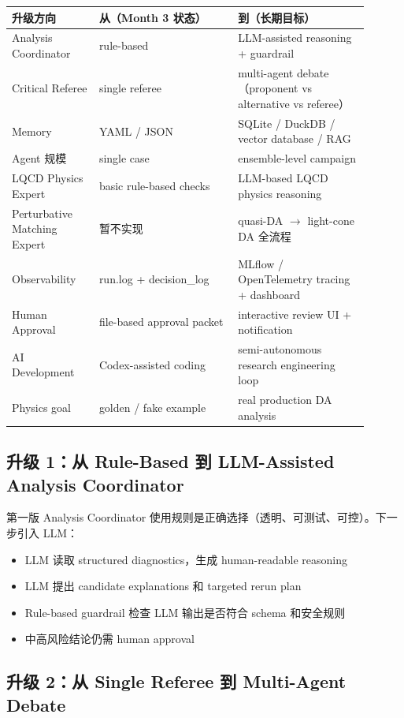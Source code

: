 \documentclass[11pt,a4paper,fontset=fandol]{ctexart}
\begin{document}
\begin{center}
\begin{tabular}{p{0.22\linewidth}p{0.35\linewidth}p{0.33\linewidth}}
\toprule
升级方向 & 从（Month 3 状态） & 到（长期目标） \\
\midrule
Analysis Coordinator & rule-based & LLM-assisted reasoning + guardrail \\
Critical Referee & single referee & multi-agent debate（proponent vs alternative vs referee） \\
Memory & YAML / JSON & SQLite / DuckDB / vector database / RAG \\
Agent 规模 & single case & ensemble-level campaign \\
LQCD Physics Expert & basic rule-based checks & LLM-based LQCD physics reasoning \\
Perturbative Matching Expert & 暂不实现 & quasi-DA $\to$ light-cone DA 全流程 \\
Observability & run.log + decision\_log & MLflow / OpenTelemetry tracing + dashboard \\
Human Approval & file-based approval packet & interactive review UI + notification \\
AI Development & Codex-assisted coding & semi-autonomous research engineering loop \\
Physics goal & golden / fake example & real production DA analysis \\
\bottomrule
\end{tabular}
\end{center}

\subsection{升级 1：从 Rule-Based 到 LLM-Assisted Analysis Coordinator}

第一版 Analysis Coordinator 使用规则是正确选择（透明、可测试、可控）。下一步引入 LLM：
\begin{itemize}
  \item LLM 读取 structured diagnostics，生成 human-readable reasoning
  \item LLM 提出 candidate explanations 和 targeted rerun plan
  \item Rule-based guardrail 检查 LLM 输出是否符合 schema 和安全规则
  \item 中高风险结论仍需 human approval
\end{itemize}

\subsection{升级 2：从 Single Referee 到 Multi-Agent Debate}
\end{document}
